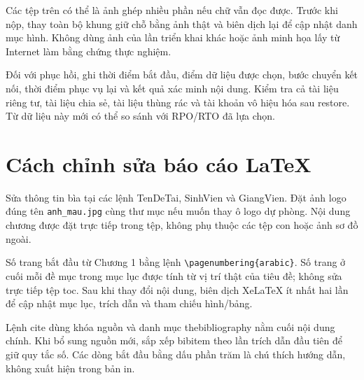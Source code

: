 Các tệp trên có thể là ảnh ghép nhiều phần nếu chữ vẫn đọc được. Trước khi nộp, thay toàn bộ khung giữ chỗ bằng ảnh thật và biên dịch lại để cập nhật danh mục hình. Không dùng ảnh của lần triển khai khác hoặc ảnh minh họa lấy từ Internet làm bằng chứng thực nghiệm.

Đối với phục hồi, ghi thời điểm bắt đầu, điểm dữ liệu được chọn, bước chuyển kết nối, thời điểm phục vụ lại và kết quả xác minh nội dung. Kiểm tra cả tài liệu riêng tư, tài liệu chia sẻ, tài liệu thùng rác và tài khoản vô hiệu hóa sau restore. Từ dữ liệu này mới có thể so sánh với RPO/RTO đã lựa chọn.
\section{Cách chỉnh sửa báo cáo LaTeX}
Sửa thông tin bìa tại các lệnh TenDeTai, SinhVien và GiangVien. Đặt ảnh logo đúng tên \texttt{anh\_mau.jpg} cùng thư mục nếu muốn thay ô logo dự phòng. Nội dung chương được đặt trực tiếp trong tệp, không phụ thuộc các tệp con hoặc ảnh sơ đồ ngoài.

Số trang bắt đầu từ Chương 1 bằng lệnh \texttt{\textbackslash pagenumbering\{arabic\}}. Số trang ở cuối mỗi đề mục trong mục lục được tính từ vị trí thật của tiêu đề; không sửa trực tiếp tệp toc. Sau khi thay đổi nội dung, biên dịch XeLaTeX ít nhất hai lần để cập nhật mục lục, trích dẫn và tham chiếu hình/bảng.

Lệnh cite dùng khóa nguồn và danh mục thebibliography nằm cuối nội dung chính. Khi bổ sung nguồn mới, sắp xếp bibitem theo lần trích dẫn đầu tiên để giữ quy tắc số. Các dòng bắt đầu bằng dấu phần trăm là chú thích hướng dẫn, không xuất hiện trong bản in.


